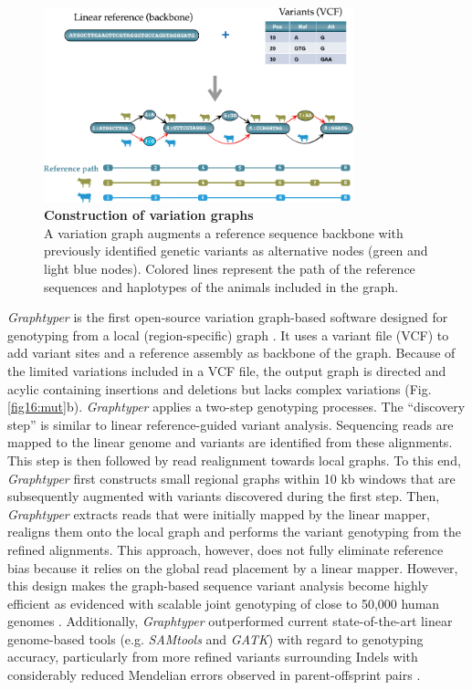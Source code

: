 \documentclass[../main.tex]{subfiles}
\begin{document}
\begin{figure}[!htb]
    \centering
    \includegraphics[width=0.8\textwidth]{intro/fig5.pdf}
        \vspace{3mm}
        \caption[Construction of variation graphs]{\textbf{Construction of variation graphs} \\
        \footnotesize{A variation graph augments a reference sequence backbone with previously identified genetic variants as alternative nodes (green and light blue nodes). Colored lines represent the path of the reference sequences and haplotypes of the animals included in the graph.}}
        \label{fig15:vargr}
\end{figure}

\emph{Graphtyper }is the first open-source variation graph-based software designed for genotyping from a local (region-specific) graph \citep{eggertsson2017graphtyper,eggertsson2019graphtyper2}. It uses a variant file (VCF) to add variant sites and a reference assembly as backbone of the graph. Because of the limited variations included in a VCF file, the output graph is directed and acylic containing insertions and deletions but lacks complex variations (Fig. \ref{fig16:mut}b). \emph{Graphtyper} applies a two-step genotyping processes. The  “discovery step” is similar to linear reference-guided variant analysis. Sequencing reads are mapped to the linear genome and variants are identified from these alignments. This step is then followed by read realignment towards local graphs. To this end, \emph{Graphtyper} first constructs small regional graphs within 10 kb windows that are subsequently augmented with variants discovered during the first step. Then, \emph{Graphtyper} extracts reads that were initially mapped by the linear mapper, realigns them onto the local graph and performs the variant genotyping from the refined alignments. This approach, however, does not  fully  eliminate reference bias because it relies on the global read placement by a linear mapper. However, this design makes the graph-based sequence variant analysis become highly efficient as evidenced with scalable joint genotyping of close to 50,000 human genomes \citep{eggertsson2019graphtyper2}. Additionally, \emph{Graphtyper} outperformed current state-of-the-art linear genome-based tools (e.g. \emph{SAMtools} and \emph{GATK}) with regard to genotyping accuracy, particularly from more refined variants surrounding Indels with considerably reduced Mendelian errors observed in parent-offsprint pairs \citep{eggertsson2017graphtyper}.
\end{document}
